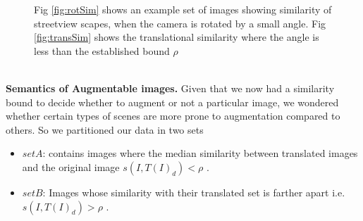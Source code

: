 \begin{figure}[!t]
	\centering
	\hspace*{-5mm}
	\vspace{-0.4cm}
	\caption{ Fig \ref{fig:rotSim} shows an example set of images showing similarity of streetview scapes, when the camera is rotated by a small angle. Fig \ref{fig:transSim} shows the translational similarity where the angle is less than the established bound $\rho$ }
	\vspace{-0.4cm}
\end{figure}


\mbox{} \\
\noindent
\textbf{Semantics of Augmentable images.}
Given that we now had a similarity bound to decide whether to augment or not a particular image, we wondered whether certain types of scenes are more prone to augmentation compared to others.  So we partitioned our data in two sets
\begin{itemize}
	\item $set A$: contains images where the median similarity  between translated images and the original image ${s(I,T(I)_d)} < \rho$ .
	
	\item $set B$:  Images whose similarity with their translated set is farther apart i.e. ${s(I,T(I)_d)} > \rho$ .
\end{itemize}

